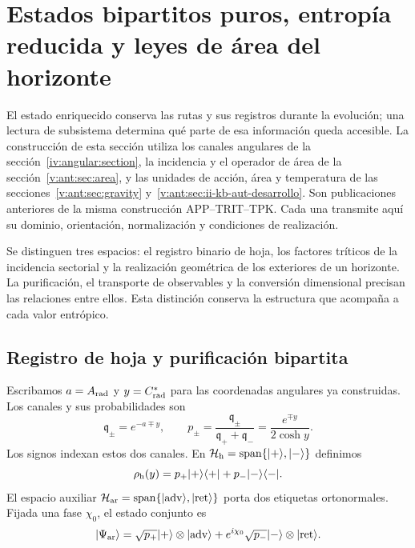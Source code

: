 
\section{Estados bipartitos puros, entropía reducida y leyes de área del horizonte}
\label{vii:sec:horizontes-informacion}

El estado enriquecido conserva las rutas y sus registros durante la
evolución; una lectura de subsistema determina qué parte de esa información
queda accesible. La construcción de esta sección utiliza los canales
angulares de la sección~\ref{iv:angular:section}, la incidencia y el
operador de área de la sección~\ref{v:ant:sec:area}, y las unidades
de acción, área y temperatura de las
secciones~\ref{v:ant:sec:gravity}
y~\ref{v:ant:sec:ii-kb-aut-desarrollo}. Son publicaciones anteriores de la
misma construcción APP--TRIT--TPK. Cada una transmite aquí su dominio,
orientación, normalización y condiciones de realización.

Se distinguen tres espacios: el registro binario de hoja, los factores
tríticos de la incidencia sectorial y la realización geométrica de los
exteriores de un horizonte. La purificación, el transporte de observables
y la conversión dimensional precisan las relaciones entre ellos. Esta
distinción conserva la estructura que acompaña a cada valor entrópico.

\subsection{Registro de hoja y purificación bipartita}
\label{vii:subsec:hojas-purificacion}

Escribamos \(a=A_{\rm rad}\) y \(y=C^*_{\rm rad}\) para las
coordenadas angulares ya construidas. Los canales y sus probabilidades son
\begin{equation}
 \mathfrak q_\pm=e^{-a\mp y},\qquad
 p_\pm=\frac{\mathfrak q_\pm}{\mathfrak q_++\mathfrak q_-}
       =\frac{e^{\mp y}}{2\cosh y}.
 \label{vii:eq:probabilidades-hoja}
\end{equation}
Los signos indexan estos dos canales. En
\(\mathcal H_{\rm h}=\operatorname{span}\{|+\rangle,|-\rangle\}\)
definimos
\[
 \rho_{\rm h}(y)=p_+|+\rangle\langle+|+p_-|-\rangle\langle-|.
\]
El espacio auxiliar
\(\mathcal H_{\rm ar}=\operatorname{span}
\{|\mathrm{adv}\rangle,|\mathrm{ret}\rangle\}\)
porta dos etiquetas ortonormales. Fijada una fase \(\chi_0\), el estado
conjunto es
\begin{equation}
 |\Psi_{\rm ar}\rangle
 =\sqrt{p_+}|+\rangle\otimes|\mathrm{adv}\rangle
  +e^{i\chi_0}\sqrt{p_-}|-\rangle\otimes|\mathrm{ret}\rangle.
 \label{vii:eq:purificacion-hoja}
\end{equation}

